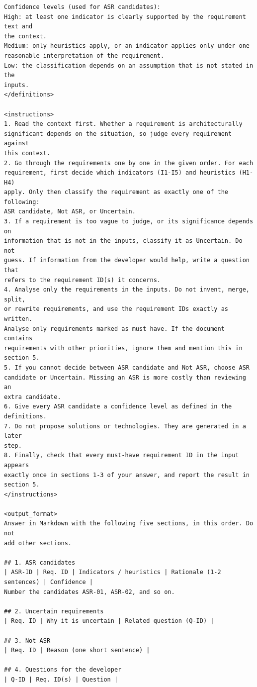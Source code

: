 \begin{lstlisting}
Confidence levels (used for ASR candidates):
High: at least one indicator is clearly supported by the requirement text and
the context.
Medium: only heuristics apply, or an indicator applies only under one
reasonable interpretation of the requirement.
Low: the classification depends on an assumption that is not stated in the
inputs.
</definitions>

<instructions>
1. Read the context first. Whether a requirement is architecturally
significant depends on the situation, so judge every requirement against
this context.
2. Go through the requirements one by one in the given order. For each
requirement, first decide which indicators (I1-I5) and heuristics (H1-H4)
apply. Only then classify the requirement as exactly one of the following:
ASR candidate, Not ASR, or Uncertain.
3. If a requirement is too vague to judge, or its significance depends on
information that is not in the inputs, classify it as Uncertain. Do not
guess. If information from the developer would help, write a question that
refers to the requirement ID(s) it concerns.
4. Analyse only the requirements in the inputs. Do not invent, merge, split,
or rewrite requirements, and use the requirement IDs exactly as written.
Analyse only requirements marked as must have. If the document contains
requirements with other priorities, ignore them and mention this in
section 5.
5. If you cannot decide between ASR candidate and Not ASR, choose ASR
candidate or Uncertain. Missing an ASR is more costly than reviewing an
extra candidate.
6. Give every ASR candidate a confidence level as defined in the definitions.
7. Do not propose solutions or technologies. They are generated in a later
step.
8. Finally, check that every must-have requirement ID in the input appears
exactly once in sections 1-3 of your answer, and report the result in
section 5.
</instructions>

<output_format>
Answer in Markdown with the following five sections, in this order. Do not
add other sections.

## 1. ASR candidates
| ASR-ID | Req. ID | Indicators / heuristics | Rationale (1-2 sentences) | Confidence |
Number the candidates ASR-01, ASR-02, and so on.

## 2. Uncertain requirements
| Req. ID | Why it is uncertain | Related question (Q-ID) |

## 3. Not ASR
| Req. ID | Reason (one short sentence) |

## 4. Questions for the developer
| Q-ID | Req. ID(s) | Question |


\end{lstlisting}
